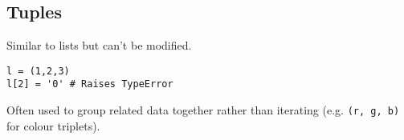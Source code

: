 \subsection{Tuples}
Similar to lists but can't be modified.
\begin{lstlisting}
l = (1,2,3)
l[2] = '0' # Raises TypeError
\end{lstlisting}

Often used to group related data together rather than iterating
(e.g. \texttt{(r, g, b)} for colour triplets).
